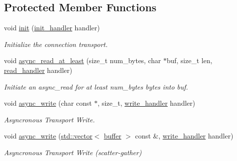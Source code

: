 \subsection*{Protected Member Functions}
\begin{DoxyCompactItemize}
\item 
void \mbox{\hyperlink{classwebsocketpp_1_1transport_1_1debug_1_1connection_a1ed8a6a163997f22ab3977c58514d607}{init}} (\mbox{\hyperlink{namespacewebsocketpp_1_1transport_aeae75e675c1a334b3b33ab7120b480a5}{init\+\_\+handler}} handler)
\begin{DoxyCompactList}\small\item\em Initialize the connection transport. \end{DoxyCompactList}\item 
void \mbox{\hyperlink{classwebsocketpp_1_1transport_1_1debug_1_1connection_a9dd1522c7700b42b9d54b32d394e32fe}{async\+\_\+read\+\_\+at\+\_\+least}} (size\+\_\+t num\+\_\+bytes, char $\ast$buf, size\+\_\+t len, \mbox{\hyperlink{namespacewebsocketpp_1_1transport_a3a9b2ed54dfcc6ebe7d7e6b4c02f53fb}{read\+\_\+handler}} handler)
\begin{DoxyCompactList}\small\item\em Initiate an async\+\_\+read for at least num\+\_\+bytes bytes into buf. \end{DoxyCompactList}\item 
void \mbox{\hyperlink{classwebsocketpp_1_1transport_1_1debug_1_1connection_aecc282f30447d46911cd54f676fe0a73}{async\+\_\+write}} (char const $\ast$, size\+\_\+t, \mbox{\hyperlink{namespacewebsocketpp_1_1transport_addf5d728159e7aa2bce2a0df947b1560}{write\+\_\+handler}} handler)
\begin{DoxyCompactList}\small\item\em Asyncronous Transport Write. \end{DoxyCompactList}\item 
void \mbox{\hyperlink{classwebsocketpp_1_1transport_1_1debug_1_1connection_af8a648a7501f13845fe6708fab59ac1f}{async\+\_\+write}} (\mbox{\hyperlink{classstd_1_1vector}{std\+::vector}}$<$ \mbox{\hyperlink{structwebsocketpp_1_1transport_1_1buffer}{buffer}} $>$ const \&, \mbox{\hyperlink{namespacewebsocketpp_1_1transport_addf5d728159e7aa2bce2a0df947b1560}{write\+\_\+handler}} handler)
\begin{DoxyCompactList}\small\item\em Asyncronous Transport Write (scatter-\/gather) \end{DoxyCompactList}\item 

\end{DoxyCompactItemize}
